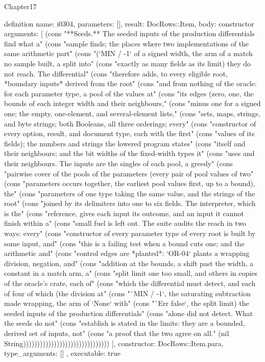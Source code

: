 \begin{lexlean}{Chapter17}
\begin{semanticmodule}
definition{
  name: i0304,
  parameters: [],
  result: DocRows::Item,
  body: constructor{
    arguments: [
      (cons "**Seeds.** The seeded inputs of the production differentials find what a" (cons "sample finds; the places where two implementations of the same arithmetic part" (cons "(`MIN / -1` of a signed width, the arm of a match no sample built, a split into" (cons "exactly as many fields as its limit) they do not reach. The differential" (cons "therefore adds, to every eligible root, *boundary inputs* derived from the root" (cons "and from nothing of the oracle: for each parameter type, a pool of the values at" (cons "its edges (zero, one, the bounds of each integer width and their neighbours," (cons "minus one for a signed one; the empty, one-element, and several-element lists," (cons "sets, maps, strings, and byte strings; both Booleans, all three orderings; every" (cons "constructor of every option, result, and document type, each with the first" (cons "values of its fields); the numbers and strings the lowered program states" (cons "itself and their neighbours; and the bit widths of the fixed-width types it" (cons "uses and their neighbours. The inputs are the singles of each pool, a greedy" (cons "pairwise cover of the pools of the parameters (every pair of pool values of two" (cons "parameters occurs together, the earliest pool values first, up to a bound), the" (cons "parameters of one type taking the same value, and the strings of the root" (cons "joined by its delimiters into one to six fields. The interpreter, which is the" (cons "reference, gives each input its outcome, and an input it cannot finish within a" (cons "small fuel is left out. The suite audits the reach in two ways: every" (cons "constructor of every parameter type of every root is built by some input, and" (cons "this is a failing test when a bound cuts one; and the arithmetic and" (cons "control edges are *planted*: `OR-04` plants a wrapping division, negation, and" (cons "addition at the bounds, a shift past the width, a constant in a match arm, a" (cons "split limit one too small, and others in copies of the oracle's crate, each of" (cons "which the differential must detect, and each of four of which (the division at" (cons "`MIN / -1`, the saturating subtraction made wrapping, the arm of `None` with" (cons "`Err false`, the split limit) the seeded inputs of the production differentials" (cons "alone did not detect. What the seeds do not" (cons "establish is stated in the limits: they are a bounded, derived set of inputs, not" (cons "a proof that the two agree on all." (nil String)))))))))))))))))))))))))))))))
    ],
    constructor: DocRows::Item.para,
    type_arguments: []
  },
  executable: true
}


\end{semanticmodule}
\end{lexlean}
